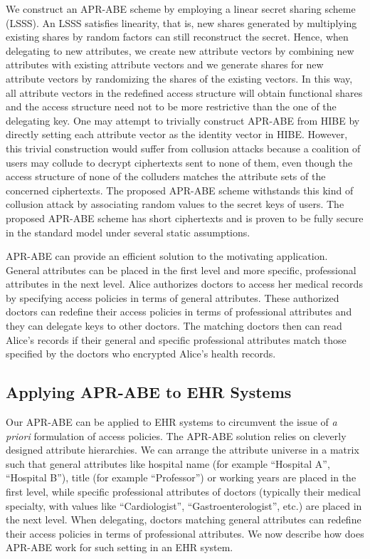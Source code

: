 \documentclass[twocolumn]{svjour3}          \smartqed  \usepackage{graphicx}
\begin{document}
We construct an  APR-ABE scheme by employing a linear secret sharing scheme (LSSS). An LSSS satisfies linearity, that is, new shares generated by multiplying existing shares by random factors can still reconstruct the secret. Hence, when delegating to new attributes, we create new attribute vectors by combining new attributes with existing attribute vectors and we generate shares for new attribute vectors by randomizing the shares of the existing vectors. In this way, all attribute vectors in the redefined access structure will obtain functional shares and the access structure need not to be more restrictive than the one
of the delegating key. One may attempt to trivially construct APR-ABE from HIBE by directly setting each attribute vector as the identity vector in HIBE. However, this trivial construction would suffer from collusion attacks because a coalition of users may collude to decrypt ciphertexts sent to none of them, 
even though the access structure of
none of the colluders matches the attribute sets of the concerned ciphertexts.
The proposed APR-ABE scheme withstands this kind of collusion attack by associating random values to the secret keys of users. The proposed  APR-ABE scheme has short ciphertexts and is proven to be fully secure in the standard model under several static assumptions.

APR-ABE can provide an efficient solution to the motivating application.
General attributes can be placed
in the first level and more specific, professional attributes in the next level. Alice authorizes doctors to access her medical records by specifying access policies in terms of general attributes. These authorized doctors can
redefine their access policies in terms of professional attributes
and they can delegate keys to other doctors. The matching doctors then can read Alice's records if their general and specific 
professional attributes match those
specified by the doctors who encrypted Alice's health records.



\subsection{Applying  APR-ABE to EHR Systems}
\label{application}

Our APR-ABE can be applied to EHR systems to circumvent the issue of {\em a priori} formulation of access policies. 
The APR-ABE solution relies on cleverly designed attribute hierarchies. We can arrange the attribute universe in a matrix such that general attributes like
hospital name (for example ``Hospital A'', ``Hospital B''), 
title (for example ``Professor'') 
or working years are placed in the first level, while 
specific professional attributes of doctors
(typically their medical specialty, with values like 
 ``Cardiologist'',  ``Gastroenterologist'', etc.)
 are placed in the next level. When delegating, doctors matching general attributes can redefine their access policies 
in terms of professional attributes.
We now describe how does APR-ABE work for such setting in an EHR system.
\end{document}
